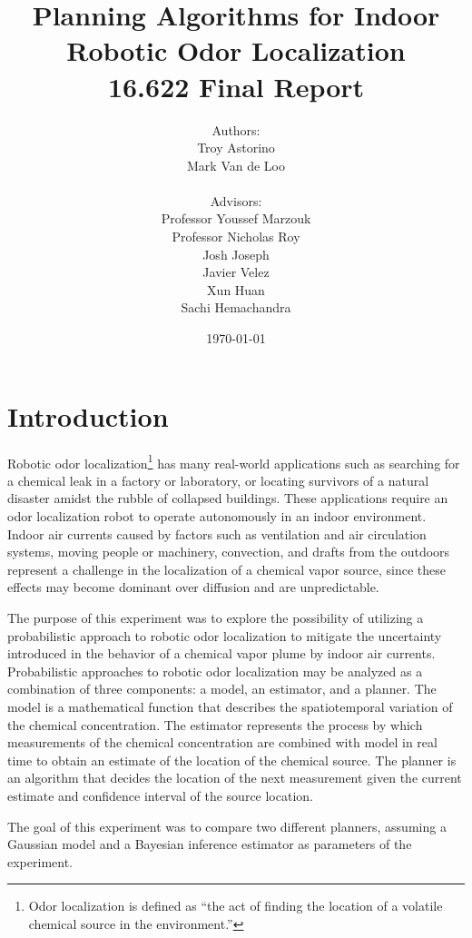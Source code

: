 \documentclass[submit, 12pt]{aiaa-pretty-modified}
\title{\textbf{Planning Algorithms for Indoor Robotic Odor
    Localization}\\
{16.622 Final Report}}
\date{\today}
\author{Authors: \\Troy Astorino \\ Mark Van de Loo \\
  \\ 
  Advisors:\\ Professor Youssef Marzouk \\ Professor Nicholas
    Roy \\ Josh Joseph \\ Javier Velez \\ Xun Huan \\ Sachi Hemachandra}
\begin{document}
\maketitle


\newpage

\tableofcontents

\newpage

\listoffigures

\newpage

\listoftables

\newpage
\onehalfspace

\section{Introduction}

Robotic odor localization\footnote{Odor localization
  is defined as ``the act of finding the location of a
volatile chemical source in the environment.''\cite{kowadlo}} has many real-world applications such as searching for a chemical leak in a
factory or laboratory, or locating survivors of a natural disaster
amidst the rubble of collapsed buildings.  These applications require an odor localization robot to operate autonomously
in an indoor environment.  Indoor air currents caused by
factors such as
ventilation and air circulation systems, moving people or machinery,
convection, and drafts from the outdoors represent a challenge in the
localization of a chemical vapor source,
since these effects may become dominant over diffusion and are unpredictable.

The purpose of this experiment was to explore the possibility of
utilizing a probabilistic approach to robotic odor localization to mitigate the uncertainty
introduced in the behavior of a chemical vapor plume by indoor
air currents.  Probabilistic approaches to robotic odor localization may be analyzed as a combination of
three components: a model, an estimator, and a planner. The model is a
mathematical function that describes the spatiotemporal variation of the
chemical concentration. The estimator represents the process by which
measurements of the chemical concentration are combined with model in real time
to obtain an estimate of the location of the chemical source. The planner is an
algorithm that decides the location of the next measurement given the current
estimate and confidence interval of the source location.

The goal of this experiment was to compare two different planners,
assuming a Gaussian model and a Bayesian inference estimator as
parameters of the experiment.
\end{document}
